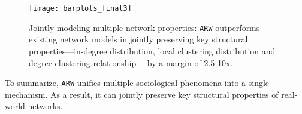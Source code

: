 \begin{figure}
	\centering
	\vspace{-6pt}
	\texttt{[image: barplots\_final3]}
	\caption{Jointly modeling multiple network properties: \texttt{ARW} outperforms
		existing network models in jointly preserving key structural properties---in-degree
		distribution, local clustering distribution and degree-clustering relationship---
		by a margin of 2.5-10x.
	}
	\vspace{-8pt}
	\label{fig:barplot}
\end{figure}

To summarize, \texttt{ARW} unifies multiple sociological phenomena
into a single mechanism. As a result, it can jointly preserve key structural
properties of real-world networks.







